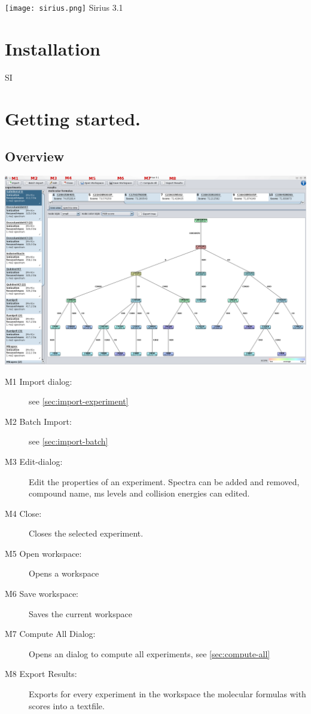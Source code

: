 \documentclass[a4paper,11pt]{article}
\begin{document}
\begin{center}
	\texttt{[image: sirius.png]}
	Sirius 3.1
\end{center}
 
 \tableofcontents
 
 \newpage
  
 \section{Installation}
 
SI
 
 \section{Getting started.}
 
 \subsection{Overview}
 
 \includegraphics[width=0.9\linewidth]{pics/mainframe.png}
 
 \begin{description}
  \item[M1 Import dialog:] see \ref{sec:import-experiment}
  \item[M2 Batch Import:] see \ref{sec:import-batch}
  \item[M3 Edit-dialog:] Edit the properties of an experiment. Spectra can be added and removed, compound name, ms levels and collision energies can edited.
  \item[M4 Close:] Closes the selected experiment.
  \item[M5 Open workspace:] Opens a workspace
  \item[M6 Save workspace:] Saves the current workspace
  \item[M7 Compute All Dialog:] Opens an dialog to compute all experiments, see \ref{sec:compute-all}
  \item[M8 Export Results:] Exports for every experiment in the workspace the molecular formulas with scores into a textfile.
 \end{description} 
 
\end{document}
